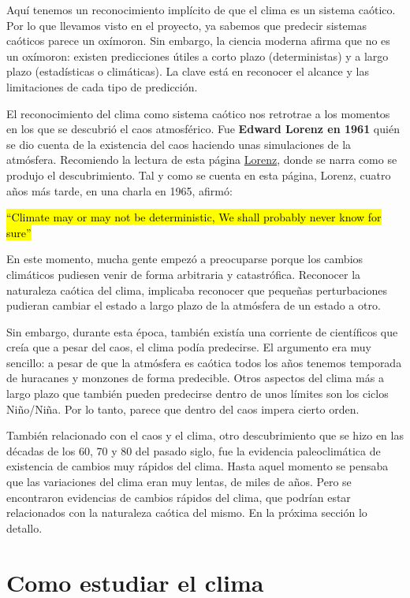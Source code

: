 \documentclass[
  10pt,
  a4paper,
  DIV=11,
  numbers=noendperiod,
  open=any]{scrreprt}
\numberwithin{equation}{chapter}
\numberwithin{equation}{section}
\renewcommand{\[}{\begin{equation}}
\renewcommand{\]}{\end{equation}}
\begin{document}
Aquí tenemos un reconocimiento implícito de que el clima es un sistema
caótico. Por lo que llevamos visto en el proyecto, ya sabemos que
predecir sistemas caóticos parece un oxímoron. Sin embargo, la ciencia
moderna afirma que no es un oxímoron: existen predicciones útiles a
corto plazo (deterministas) y a largo plazo (estadísticas o climáticas).
La clave está en reconocer el alcance y las limitaciones de cada tipo de
predicción.

El reconocimiento del clima como sistema caótico nos retrotrae a los
momentos en los que se descubrió el caos atmosférico. Fue \textbf{Edward
Lorenz en 1961} quién se dio cuenta de la existencia del caos haciendo
unas simulaciones de la atmósfera. Recomiendo la lectura de esta página
\href{https://history.aip.org/climate/chaos.htm}{Lorenz}, donde se narra
como se produjo el descubrimiento. Tal y como se cuenta en esta página,
Lorenz, cuatro años más tarde, en una charla en 1965, afirmó:

\hl{``Climate may or may not be deterministic, We shall probably never
know for sure''}

En este momento, mucha gente empezó a preocuparse porque los cambios
climáticos pudiesen venir de forma arbitraria y catastrófica. Reconocer
la naturaleza caótica del clima, implicaba reconocer que pequeñas
perturbaciones pudieran cambiar el estado a largo plazo de la atmósfera
de un estado a otro.

Sin embargo, durante esta época, también existía una corriente de
científicos que creía que a pesar del caos, el clima podía predecirse.
El argumento era muy sencillo: a pesar de que la atmósfera es caótica
todos los años tenemos temporada de huracanes y monzones de forma
predecible. Otros aspectos del clima más a largo plazo que también
pueden predecirse dentro de unos límites son los ciclos Niño/Niña. Por
lo tanto, parece que dentro del caos impera cierto orden.

También relacionado con el caos y el clima, otro descubrimiento que se
hizo en las décadas de los 60, 70 y 80 del pasado siglo, fue la
evidencia paleoclimática de existencia de cambios muy rápidos del clima.
Hasta aquel momento se pensaba que las variaciones del clima eran muy
lentas, de miles de años. Pero se encontraron evidencias de cambios
rápidos del clima, que podrían estar relacionados con la naturaleza
caótica del mismo. En la próxima sección lo detallo.

\section{Como estudiar el clima}\label{como-estudiar-el-clima}
\end{document}
